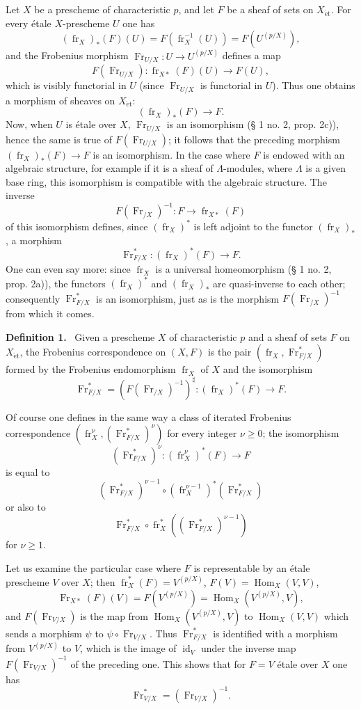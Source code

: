 \documentclass[11pt]{article}
\newenvironment{statement}[1]{\par\medskip\noindent\textbf{#1.}\ }{\par\medskip}
\DeclareMathOperator{\Hom}{Hom}
\providecommand{\et}{\mathrm{\acute{e}t}}
\providecommand{\id}{\operatorname{id}}
\providecommand{\Hom}{\operatorname{Hom}}
\providecommand{\id}{\operatorname{id}}
\providecommand{\id}{\operatorname{id}}
\providecommand{\id}{\operatorname{id}}
\providecommand{\id}{\operatorname{id}}
\providecommand{\Hom}{\operatorname{Hom}}
\providecommand{\fr}{\operatorname{fr}}
\providecommand{\Fr}{\operatorname{Fr}}
\providecommand{\Fr}{\operatorname{Fr}}
\providecommand{\fr}{\operatorname{fr}}
\providecommand{\id}{\operatorname{id}}
\providecommand{\et}{\acute{e}t}
\begin{document}
Let $X$ be a prescheme of characteristic $p$, and let $F$ be a sheaf of sets on $X_{\et}$. For every étale $X$-prescheme $U$ one has
\[
(\fr_X)_*(F)(U)=F(\fr_X^{-1}(U))=F(U^{(p/X)}),
\]
and the Frobenius morphism $\Fr_{U/X}:U\to U^{(p/X)}$ defines a map
\[
F(\Fr_{U/X}):\fr_{X*}(F)(U)\longrightarrow F(U),
\]
which is visibly functorial in $U$ (since $\Fr_{U/X}$ is functorial in $U$). Thus one obtains a morphism of sheaves on $X_{\et}$:
\[
(\fr_X)_*(F)\longrightarrow F.
\]
Now, when $U$ is étale over $X$, $\Fr_{U/X}$ is an isomorphism (§ 1 no. 2, prop. 2c)), hence the same is true of $F(\Fr_{U/X})$; it follows that the preceding morphism $(\fr_X)_*(F)\to F$ is an isomorphism. In the case where $F$ is endowed with an algebraic structure, for example if it is a sheaf of $\Lambda$-modules, where $\Lambda$ is a given base ring, this isomorphism is compatible with the algebraic structure. The inverse
\[
F(\Fr_{/X})^{-1}:F\longrightarrow \fr_{X*}(F)
\]
of this isomorphism defines, since $(\fr_X)^*$ is left adjoint to the functor $(\fr_X)_*$, a morphism
\[
\Fr^*_{F/X}:(\fr_X)^*(F)\longrightarrow F.
\]
One can even say more: since $\fr_X$ is a universal homeomorphism (§ 1 no. 2, prop. 2a)), the functors $(\fr_X)^*$ and $(\fr_X)_*$ are quasi-inverse to each other; consequently $\Fr^*_{F/X}$ is an isomorphism, just as is the morphism $F(\Fr_{/X})^{-1}$ from which it comes.

\begin{statement}{Definition 1}
Given a prescheme $X$ of characteristic $p$ and a sheaf of sets $F$ on $X_{\et}$, the Frobenius correspondence on $(X,F)$ is the pair $(\fr_X,\Fr^*_{F/X})$ formed by the Frobenius endomorphism $\fr_X$ of $X$ and the isomorphism
\[
\Fr^*_{F/X}=(F(\Fr_{/X})^{-1})^\sharp:(\fr_X)^*(F)\longrightarrow F.
\]
\end{statement}

Of course one defines in the same way a class of iterated Frobenius correspondence $(\fr_X^\nu,(\Fr^*_{F/X})^\nu)$ for every integer $\nu\geq0$; the isomorphism
\[
(\Fr^*_{F/X})^\nu:(\fr_X^\nu)^*(F)\longrightarrow F
\]
is equal to
\[
(\Fr^*_{F/X})^{\nu-1}\circ (\fr_X^{\nu-1})^*(\Fr^*_{F/X})
\]
or also to
\[
\Fr^*_{F/X}\circ\fr_X^*((\Fr^*_{F/X})^{\nu-1})
\]
for $\nu\geq1$.

Let us examine the particular case where $F$ is representable by an étale prescheme $V$ over $X$; then $\fr_X^*(F)=V^{(p/X)}$, $F(V)=\Hom_X(V,V)$,
\[
\Fr_{X*}(F)(V)=F(V^{(p/X)})=\Hom_X(V^{(p/X)},V),
\]
and $F(\Fr_{V/X})$ is the map from $\Hom_X(V^{(p/X)},V)$ to $\Hom_X(V,V)$ which sends a morphism $\psi$ to $\psi\circ\Fr_{V/X}$. Thus $\Fr^*_{F/X}$ is identified with a morphism from $V^{(p/X)}$ to $V$, which is the image of $\id_V$ under the inverse map $F(\Fr_{V/X})^{-1}$ of the preceding one. This shows that for $F=V$ étale over $X$ one has
\[
\Fr^*_{V/X}=(\Fr_{V/X})^{-1}.
\]
\end{document}
